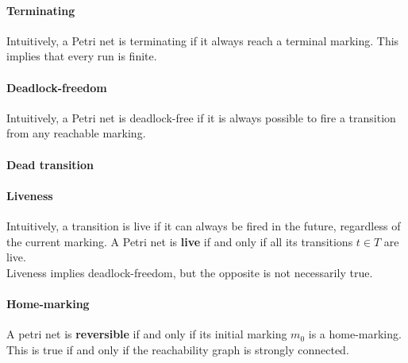 \paragraph{Terminating}
Intuitively, a Petri net is terminating if it always reach a terminal marking. This implies that every run is finite.
\paragraph{Deadlock-freedom}
Intuitively, a Petri net is deadlock-free if it is always possible to fire a transition from any reachable marking.
\paragraph{Dead transition}
\paragraph{Liveness}
Intuitively, a transition is live if it can always be fired in the future, regardless of the current marking.
A Petri net is \textbf{live} if and only if all its transitions \(t \in T\) are live.
\\ Liveness implies deadlock-freedom, but the opposite is not necessarily true.
\paragraph{Home-marking}
A petri net is \textbf{reversible} if and only if its initial marking \(m_0\) is a home-marking. This is true if and only if the reachability graph is strongly connected.


